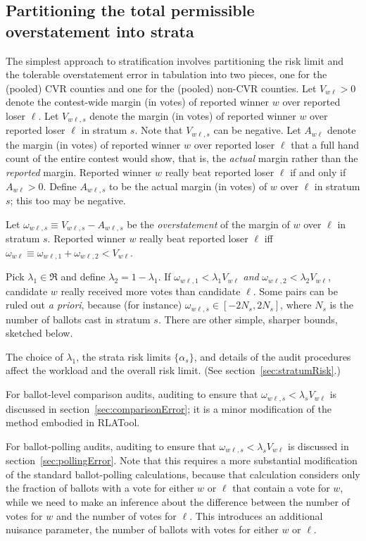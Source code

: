 \documentclass[12pt]{article}
\begin{document}
\subsection{Partitioning the total permissible overstatement into strata}
The simplest approach to stratification involves partitioning the risk limit and the tolerable
overstatement error in tabulation into
two pieces, one for the (pooled) CVR counties and one for the (pooled) non-CVR counties.
Let $V_{w\ell} > 0$ denote the contest-wide margin (in votes) of reported winner 
$w$ over reported loser
$\ell$.
Let $V_{w\ell,s}$ denote the margin (in votes) of reported winner $w$ over reported loser $\ell$
in stratum $s$. 
Note that $V_{w\ell,s}$ can be negative.
Let $A_{w\ell}$ denote the margin (in votes)
of reported winner $w$ over reported loser $\ell$ that 
a full hand count of the entire contest would show, that is, the \emph{actual} margin rather
than the \emph{reported} margin.
Reported winner $w$ really beat reported loser $\ell$ if and only if $A_{w\ell} > 0$.
Define $A_{w\ell,s}$ to be the actual margin (in votes) of $w$ over $\ell$ in stratum $s$;
this too may be negative.

Let $\omega_{w\ell,s} \equiv V_{w\ell,s} - A_{w\ell,s}$ be the \emph{overstatement}
of the margin of $w$ over $\ell$ in stratum $s$.
Reported winner $w$ really beat reported loser 
$\ell$ iff $\omega_{w\ell} \equiv \omega_{w\ell,1} + \omega_{w\ell,2} < V_{w\ell}$.

Pick $\lambda_1 \in \Re$ and define $\lambda_2 = 1-\lambda_1$.
If $\omega_{w\ell,1} < \lambda_1 V_{w\ell}$ \emph{and} 
$\omega_{w\ell,2} < \lambda_2 V_{w\ell}$, candidate $w$ really received more votes
than candidate $\ell$.
Some pairs can be ruled out \emph{a priori}, because (for instance) $\omega_{w\ell,s} \in [-2N_s, 2N_s]$,
where $N_s$ is the number of ballots cast in stratum $s$.
There are other simple, sharper bounds, sketched below.

The choice of $\lambda_1$, the strata risk limits $\{\alpha_s\}$, and details of the
audit procedures affect the workload and the overall risk limit.
(See section~\ref{sec:stratumRisk}.)

For ballot-level comparison audits, auditing to ensure that $\omega_{w\ell,s} < \lambda_s V_{w\ell}$
is discussed in section~\ref{sec:comparisonError}; it is a minor modification of the method
embodied in RLATool.

For ballot-polling audits, auditing to ensure that $\omega_{w\ell,s} < \lambda_s V_{w\ell}$ is discussed in section~\ref{sec:pollingError}.
Note that this requires a more substantial modification of the standard ballot-polling calculations,
because that calculation considers only the fraction of ballots with a vote for either 
$w$ or $\ell$ that contain a vote for $w$, while we need to make an inference about the 
difference between the number of votes for $w$ and the number of votes for $\ell$.
This introduces an additional nuisance parameter, the number of ballots with votes for either
$w$ or $\ell$.
\end{document}
